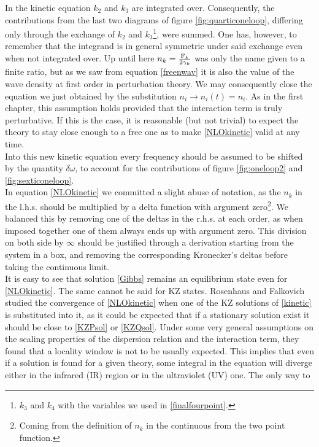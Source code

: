 In the kinetic equation $k_2$ and $k_3$ are integrated over. Consequently, the contributions from the last two diagrams of figure \ref{fig:quarticoneloop}, 
differing only through the exchange of $k_2$ and $k_3$\footnote{
    $k_3$ and $k_4$ with the variables we used in \eqref{finalfourpoint}.
}, were summed. One has, however, to remember that the integrand is in general symmetric under said exchange even when not integrated over.  
Up until here $n_k = \frac{\mathrm{F}_k}{2\gamma_k}$ was only the name given to a finite ratio, but as we saw from equation \eqref{freenwav} it is also the value of the 
wave density at first order in perturbation theory. We may consequently close the equation we just obtained by the substitution $n_i \rightarrow n_i(t) = n_i$. 
As in the first chapter, this assumption holds provided that the interaction term is truly perturbative. If this is the case, it is reasonable (but not trivial) 
to expect the theory to stay close enough to a free one as to make \eqref{NLOkinetic} valid at any time. \\ 
Into this new kinetic equation every frequency should be assumed to be shifted by the quantity $\delta\omega$, to account for the contributions of 
figure \ref{fig:oneloop2} and \ref{fig:sexticoneloop}.\\
In equation \eqref{NLOkinetic} we committed a slight abuse of notation, as the $n_k$ in the l.h.s. should be multiplied by a delta function with argument zero\footnote{Coming from the definition of $n_k$ in the continuous from the two point function.}. We balanced this by removing one of the deltas in the r.h.s. at each order, as when imposed together one of them always ends up with argument zero. This division on both side by $\infty$ should be justified through a derivation starting from the system in a box, and removing the corresponding Kronecker's deltas before taking the continuous limit.\\
It is easy to see that solution \eqref{Gibbs} remains an equilibrium state even for \eqref{NLOkinetic}. The same cannot be said for 
KZ states. Rosenhaus and Falkovich studied the convergence of \eqref{NLOkinetic} when one of the KZ solutions of \eqref{kinetic} is substituted into it, 
as it could be expected that if a stationary solution exist it should be close to \eqref{KZPsol} or \eqref{KZQsol}. Under some very general assumptions on the 
scaling properties of the dispersion relation and the interaction term, they found that a locality window is not to be usually expected. This implies that even if 
a solution is found for a given theory, some integral in the equation will diverge either in the infrared (IR) region or in the ultraviolet (UV) one. The only way to

